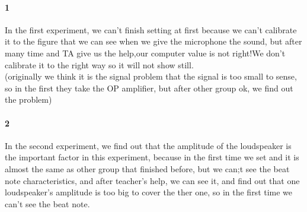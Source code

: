 \documentclass[12pt]{article}
\begin{document}
\paragraph{1}
In the first experiment, we can't finish setting at first because we can't calibrate it to the figure that we can see when we give the microphone the sound, but after many time and TA give us the help,our computer value is not right!We don't calibrate it to the right way so it will not show still.\\
(originally we think it is the signal problem that the signal is too small to sense, so in the first they take the OP amplifier, but after other group ok, we find out the problem)
\paragraph{2}
In the second experiment, we find out that the amplitude of the loudspeaker is the important factor in this experiment, because in the first time we set and it is almost the same as other group that finished before, but we can;t see the beat note characteristics, and after teacher's help, we can see it, and find out that one loudspeaker's amplitude is too big to cover the ther one, so in the first time we can't see the beat note. 


 
\end{document}
